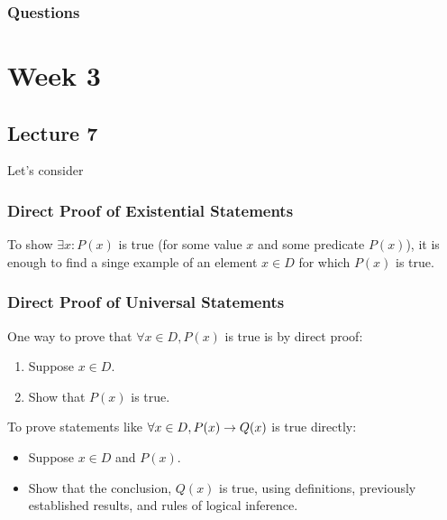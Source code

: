 \documentclass{report}
\begin{document}
\subsection*{Questions}

\chapter{Week 3}
\section{Lecture 7}
Let's consider


\subsection*{Direct Proof of Existential Statements}
To show $\exists x: P(x)$ is true (for some value $x$ and some predicate $P(x)$), it is enough to find a singe example of an element $x\in D$ for which $P(x)$ is true.

\subsection*{Direct Proof of Universal Statements}
One way to prove that $\forall x\in D, P(x)$ is true is by direct proof:
\begin{enumerate}
	\item Suppose $x\in D$.
	\item Show that $P(x)$ is true.
\end{enumerate}
To prove statements like $\forall x\in D, P(x) \rightarrow Q(x)$ is true directly:
\begin{itemize}
	\item Suppose $x\in D$ and $P(x)$.
	\item Show that the conclusion, $Q(x)$ is true, using definitions, previously established results, and rules of logical inference.
\end{itemize}
\end{document}
